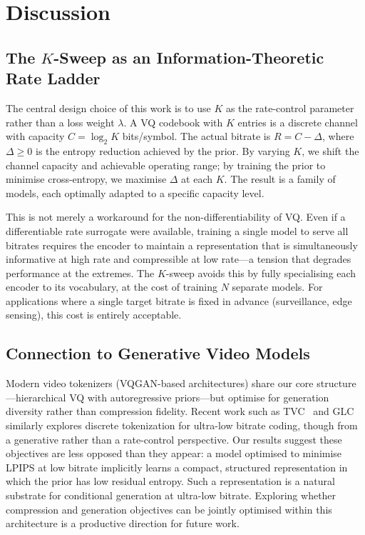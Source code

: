 \documentclass[sigconf, screen, review, anonymous]{acmart}
\begin{document}
\section{Discussion}
\label{sec:discussion}

\subsection{The $K$-Sweep as an Information-Theoretic Rate Ladder}

The central design choice of this work is to use $K$ as the
rate-control parameter rather than a loss weight $\lambda$. A VQ
codebook with $K$ entries is a discrete channel with capacity
$C = \log_2 K$ bits/symbol. The actual bitrate is $R = C - \Delta$,
where $\Delta \geq 0$ is the entropy reduction achieved by the prior.
By varying $K$, we shift the channel capacity and achievable operating
range; by training the prior to minimise cross-entropy, we maximise
$\Delta$ at each $K$. The result is a family of models, each optimally
adapted to a specific capacity level.

This is not merely a workaround for the non-differentiability of VQ.
Even if a differentiable rate surrogate were available, training a
single model to serve all bitrates requires the encoder to maintain a
representation that is simultaneously informative at high rate and
compressible at low rate---a tension that degrades performance at the
extremes. The $K$-sweep avoids this by fully specialising each encoder
to its vocabulary, at the cost of training $N$ separate models. For
applications where a single target bitrate is fixed in advance
(surveillance, edge sensing), this cost is entirely acceptable.

\subsection{Connection to Generative Video Models}

Modern video tokenizers (VQGAN-based architectures) share our core
structure---hierarchical VQ with autoregressive priors---but optimise
for generation diversity rather than compression fidelity. Recent
work such as TVC~\cite{tvc2025} and GLC~\cite{jia2024glc} similarly
explores discrete tokenization for ultra-low bitrate coding, though
from a generative rather than a rate-control perspective.
Our results suggest these objectives are less opposed than they appear:
a model optimised to minimise LPIPS at low bitrate implicitly learns
a compact, structured representation in which the prior has low
residual entropy. Such a representation is a natural substrate for
conditional generation at ultra-low bitrate. Exploring whether
compression and generation objectives can be jointly optimised within
this architecture is a productive direction for future work.
\end{document}
